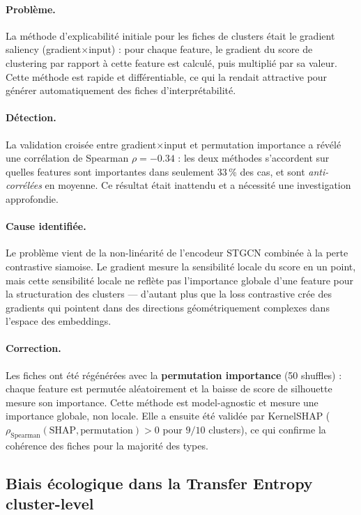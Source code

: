 \paragraph{Problème.}
La méthode d'explicabilité initiale pour les fiches de clusters était le gradient saliency
(gradient$\times$input) : pour chaque feature, le gradient du score de clustering
par rapport à cette feature est calculé, puis multiplié par sa valeur.
Cette méthode est rapide et différentiable, ce qui la rendait attractive pour générer
automatiquement des fiches d'interprétabilité.

\paragraph{Détection.}
La validation croisée entre gradient$\times$input et permutation importance a révélé
une corrélation de Spearman $\rho = -0.34$ : les deux méthodes s'accordent sur quelles
features sont importantes dans seulement $33$\,\% des cas, et sont \emph{anti-corrélées}
en moyenne. Ce résultat était inattendu et a nécessité une investigation approfondie.

\paragraph{Cause identifiée.}
Le problème vient de la non-linéarité de l'encodeur STGCN combinée à la perte
contrastive siamoise. Le gradient mesure la sensibilité locale du score en un point,
mais cette sensibilité locale ne reflète pas l'importance globale d'une feature pour
la structuration des clusters --- d'autant plus que la loss contrastive crée des
gradients qui pointent dans des directions géométriquement complexes dans l'espace
des embeddings.

\paragraph{Correction.}
Les fiches ont été régénérées avec la \textbf{permutation importance} (50 shuffles) :
chaque feature est permutée aléatoirement et la baisse de score de silhouette mesure
son importance. Cette méthode est model-agnostic et mesure une importance globale,
non locale. Elle a ensuite été validée par KernelSHAP \cite{lundberg2017}
($\rho_\text{Spearman}(\text{SHAP}, \text{permutation}) > 0$ pour $9/10$ clusters),
ce qui confirme la cohérence des fiches pour la majorité des types.

\subsection{Biais écologique dans la Transfer Entropy cluster-level}
\label{sec:diff_te}

